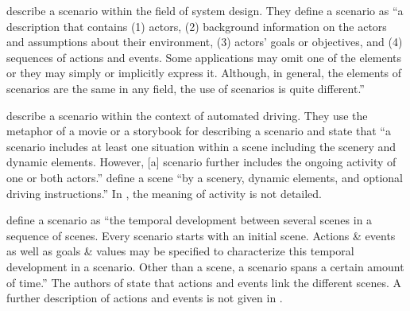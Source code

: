 \textcite{go2004blind} describe a scenario within the field of system design. They define a scenario as ``a description that contains (1) actors, (2) background information on the actors and assumptions about their environment, (3) actors' goals or objectives, and (4) sequences of actions and events. Some applications may omit one of the elements or they may simply or implicitly express it. Although, in general, the elements of scenarios are the same in any field, the use of scenarios is quite different.'' 

\textcite{geyer2014} describe a scenario within the context of automated driving. They use the metaphor of a movie or a storybook for describing a scenario and state that ``a scenario includes at least one situation within a scene including the scenery and dynamic elements. However, [a] scenario further includes the ongoing activity of one or both actors.'' \textcite{geyer2014} define a scene ``by a scenery, dynamic elements, and optional driving instructions.''
In \autocite{geyer2014}, the meaning of activity is not detailed.

\textcite{ulbrich2015} define a scenario as ``the temporal development between several scenes in a sequence of scenes. Every scenario starts with an initial scene. Actions \& events as well as goals \& values may be specified to characterize this temporal development in a scenario. Other than a scene, a scenario spans a certain amount of time.'' The authors of \autocite{ulbrich2015} state that actions and events link the different scenes. A further description of actions and events is not given in \autocite{ulbrich2015}.


